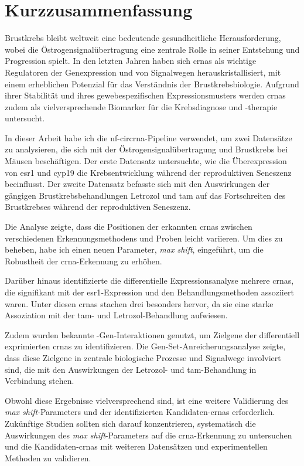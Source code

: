 \newpage

\section{Kurzzusammenfassung}

Brustkrebs bleibt weltweit eine bedeutende gesundheitliche Herausforderung,
wobei die Östrogensignalübertragung eine zentrale Rolle in seiner Entstehung
und Progression spielt.
In den letzten Jahren haben sich \glspl{crna} als wichtige Regulatoren der
Genexpression und von Signalwegen herauskristallisiert, mit einem erheblichen
Potenzial für das Verständnis der Brustkrebsbiologie.
Aufgrund ihrer Stabilität und ihres gewebespezifischen Expressionsmusters
werden \glspl{crna} zudem als vielversprechende Biomarker für die Krebsdiagnose
und -therapie untersucht.

In dieser Arbeit habe ich die \gls{nf-circrna}-Pipeline verwendet, um zwei
Datensätze zu analysieren, die sich mit der Östrogensignalübertragung und
Brustkrebs bei Mäusen beschäftigen.
Der erste Datensatz untersuchte, wie die Überexpression von \gls{esr1} und
\gls{cyp19} die Krebsentwicklung während der reproduktiven Seneszenz
beeinflusst.
Der zweite Datensatz befasste sich mit den Auswirkungen der gängigen
Brustkrebsbehandlungen Letrozol und \Gls{tam} auf das Fortschreiten des
Brustkrebses während der reproduktiven Seneszenz.

Die Analyse zeigte, dass die Positionen der erkannten \glspl{crna} zwischen
verschiedenen Erkennungsmethodens und Proben leicht variieren.
Um dies zu beheben, habe ich einen neuen Parameter, \textit{max shift},
eingeführt, um die Robustheit der \gls{crna}-Erkennung zu erhöhen.

Darüber hinaus identifizierte die differentielle Expressionsanalyse mehrere
\glspl{crna}, die signifikant mit der \gls{esr1}-Expression und den
Behandlungsmethoden assoziiert waren.
Unter diesen \glspl{crna} stachen drei besonders hervor, da sie eine starke
Assoziation mit der \Gls{tam}- und Letrozol-Behandlung aufwiesen.

Zudem wurden bekannte -Gen-Interaktionen genutzt, um Zielgene
der differentiell exprimierten \glspl{crna} zu identifizieren.
Die Gen-Set-Anreicherungsanalyse zeigte, dass diese Zielgene in zentrale
biologische Prozesse und Signalwege involviert sind, die mit den Auswirkungen
der Letrozol- und \Gls{tam}-Behandlung in Verbindung stehen.

Obwohl diese Ergebnisse vielversprechend sind, ist eine weitere Validierung des
\textit{max shift}-Parameters und der identifizierten Kandidaten-\glspl{crna}
erforderlich.
Zukünftige Studien sollten sich darauf konzentrieren, systematisch die
Auswirkungen des \textit{max shift}-Parameters auf die \gls{crna}-Erkennung zu
untersuchen und die Kandidaten-\glspl{crna} mit weiteren Datensätzen und
experimentellen Methoden zu validieren.
